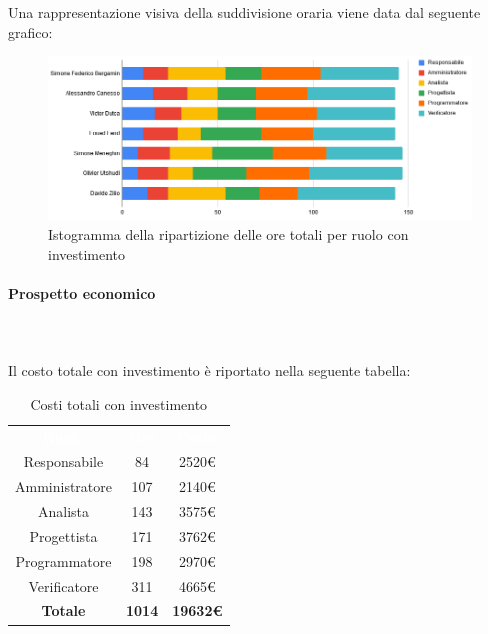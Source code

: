 Una rappresentazione visiva della suddivisione oraria viene data dal seguente grafico:
\begin{figure}[H]
\centering
\includegraphics[scale=0.60]{img/grafici/tabella_tot_con_analisi.png}
\caption{Istogramma della ripartizione delle ore totali per ruolo con investimento}
\end{figure}

\paragraph{Prospetto economico} \mbox{} \\ \mbox{} \\
Il costo totale con investimento è riportato nella seguente tabella:

\begin{table}[H]
\centering\renewcommand{\arraystretch}{1.5}
\caption{Costi totali con investimento}
\vspace{0.2cm}
\begin{tabular}{ c | c | c  }
\rowcolor{redafk}
\textcolor{white}{\textbf{Ruolo}} & \textcolor{white}{\textbf{Ore}} & 
\textcolor{white}{\textbf{Costo}}  \\
Responsabile & 84 & 2520€ \\
Amministratore & 107 & 2140€ \\
Analista & 143 & 3575€ \\
Progettista	& 171 & 3762€ \\
Programmatore & 198 & 2970€  \\
Verificatore & 311 & 4665€  \\
\rowcolor{lastrowcolor}
\textbf{Totale} & \textbf{1014} & \textbf{19632€}  \\
\end{tabular}
\end{table}

